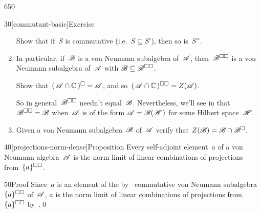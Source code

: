 \begin{parsec}{650}
\begin{point}{30}[commutant-basic]{Exercise}
\begin{enumerate}
Show that if~$S$ is commutative (i.e.~$S\subseteq S^\square$), 
then so is~$S^{\square\square}$.
\item
In particular,
if~$\mathscr{B}$ is a von Neumann subalgebra of~$\mathscr{A}$,
then~$\mathscr{B}^{\square\square}$
is a von Neumann subalgebra of~$\mathscr{A}$
with $\mathscr{B}\subseteq \mathscr{B}^{\square\square}$.

Show that~$(\,\mathscr{A}\cap \mathbb{C}\,)^\square=\mathscr{A}$,
and so~$(\,\mathscr{A}\cap\mathbb{C}\,)^{\square\square} = Z(\mathscr{A})$.

So in general~$\mathscr{B}^{\square\square}$ needn't equal~$\mathscr{B}$.
Nevertheless,
we'll see in  that $\mathscr{B}^{\square\square}=\mathscr{B}$
when~$\mathscr{A}$ is of the form $\mathscr{A}=\mathscr{B}(\mathscr{H})$
for some Hilbert space~$\mathscr{H}$.
\item
Given a von Neumann subalgebra~$\mathscr{B}$
of~$\mathscr{A}$
verify that $Z(\mathscr{B})=\mathscr{B}\cap \mathscr{B}^{\square}$.
\end{enumerate}
\end{point}
\begin{point}{40}[projections-norm-dense]{Proposition}%
Every self-adjoint element~$a$ of a von Neumann algebra~$\mathscr{A}$
is the norm limit
of linear combinations
of projections from~$\smash{\{a\}}^{\square\square}$.
\begin{point}{50}{Proof}%
Since~$a$ is an element
of the by~
commutative von Neumann subalgebra~$\smash{\{a\}}^{\square\square}$
of~$\mathscr{A}$,
$a$ is the norm limit of linear combinations
of projections from~$\smash{\{a\}}^{\square\square}$
by~.\qed
\end{point}
\end{point}
\end{parsec}
